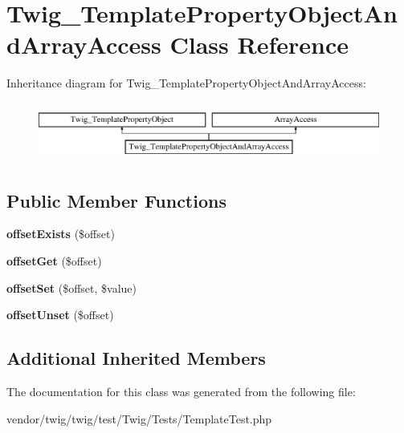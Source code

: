 \hypertarget{classTwig__TemplatePropertyObjectAndArrayAccess}{}\section{Twig\+\_\+\+Template\+Property\+Object\+And\+Array\+Access Class Reference}
\label{classTwig__TemplatePropertyObjectAndArrayAccess}
Inheritance diagram for Twig\+\_\+\+Template\+Property\+Object\+And\+Array\+Access\+:\begin{figure}[H]
\begin{center}
\leavevmode
\includegraphics[height=1.951219cm]{classTwig__TemplatePropertyObjectAndArrayAccess}
\end{center}
\end{figure}
\subsection*{Public Member Functions}
\begin{DoxyCompactItemize}
\item 
{\bfseries offset\+Exists} (\$offset)\hypertarget{classTwig__TemplatePropertyObjectAndArrayAccess_a4b3489ec125146d90e1f0953e17d8d2c}{}\label{classTwig__TemplatePropertyObjectAndArrayAccess_a4b3489ec125146d90e1f0953e17d8d2c}

\item 
{\bfseries offset\+Get} (\$offset)\hypertarget{classTwig__TemplatePropertyObjectAndArrayAccess_a27faeb2eb22ad520298b1fbeeba561a3}{}\label{classTwig__TemplatePropertyObjectAndArrayAccess_a27faeb2eb22ad520298b1fbeeba561a3}

\item 
{\bfseries offset\+Set} (\$offset, \$value)\hypertarget{classTwig__TemplatePropertyObjectAndArrayAccess_a08c28f484b9bafbe3d5654e034efd92b}{}\label{classTwig__TemplatePropertyObjectAndArrayAccess_a08c28f484b9bafbe3d5654e034efd92b}

\item 
{\bfseries offset\+Unset} (\$offset)\hypertarget{classTwig__TemplatePropertyObjectAndArrayAccess_ad5b37433d2ed99e215d0d79c21aeae26}{}\label{classTwig__TemplatePropertyObjectAndArrayAccess_ad5b37433d2ed99e215d0d79c21aeae26}

\end{DoxyCompactItemize}
\subsection*{Additional Inherited Members}


The documentation for this class was generated from the following file\+:\begin{DoxyCompactItemize}
\item 
vendor/twig/twig/test/\+Twig/\+Tests/Template\+Test.\+php\end{DoxyCompactItemize}
